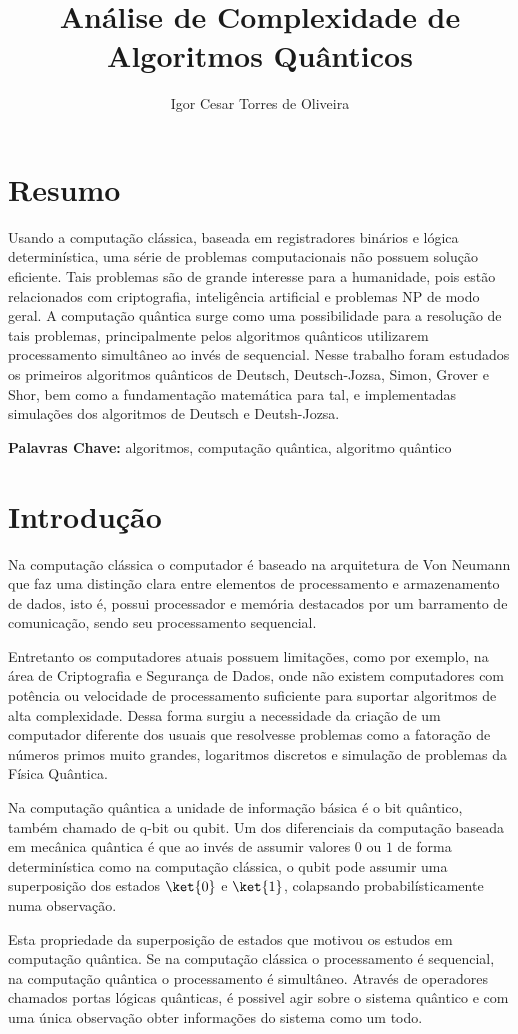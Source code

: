\documentclass[pfc]{imetex}
\author{Igor Cesar Torres de Oliveira}
\title{Análise de Complexidade de Algoritmos Quânticos}
\date{\the\year}
\begin{document}
 
\printFrontMatter

\chapter*{Resumo}
Usando a computação clássica, baseada em registradores binários e lógica determinística, uma série de problemas computacionais não possuem solução eficiente. Tais problemas são de grande interesse para a humanidade, pois estão relacionados com criptografia, inteligência artificial e problemas NP de modo geral. A computação quântica surge como uma possibilidade para a resolução de tais problemas, principalmente pelos algoritmos quânticos utilizarem processamento simultâneo ao invés de sequencial. Nesse trabalho foram estudados os primeiros algoritmos quânticos de Deutsch, Deutsch-Jozsa, Simon, Grover e Shor, bem como a fundamentação matemática para tal, e implementadas simulações dos algoritmos de Deutsch e Deutsh-Jozsa.

\textbf{Palavras Chave:} algoritmos, computação quântica, algoritmo quântico

\chapter{Introdução}
Na computação clássica o computador é baseado na arquitetura de Von Neumann que faz uma distinção clara entre elementos de processamento e armazenamento de dados, isto é, possui processador e memória destacados por um barramento de comunicação, sendo seu processamento sequencial.
 
Entretanto os computadores atuais possuem limitações, como por exemplo, na área de Criptografia e Segurança de Dados, onde não existem computadores com potência ou velocidade de processamento suficiente para suportar algoritmos de alta complexidade. Dessa forma surgiu a necessidade da criação de um computador diferente dos usuais que resolvesse problemas como a fatoração de números primos muito grandes, logaritmos discretos e simulação de problemas da Física Quântica.
  
Na computação quântica a unidade de informação básica é o bit quântico, também chamado de q-bit ou qubit. Um dos diferenciais da computação baseada em mecânica quântica é que ao invés de assumir valores $0$ ou $1$ de forma determinística como na computação clássica, o qubit pode assumir uma superposição dos estados $\ket{0}$ e $\ket{1}$, colapsando probabilísticamente numa observação.
 
Esta propriedade da superposição de estados que motivou os estudos em computação quântica. Se na computação clássica o processamento é sequencial, na computação quântica o processamento é simultâneo. Através de operadores chamados portas lógicas quânticas, é possivel agir sobre o sistema quântico e com uma única observação obter informações do sistema como um todo.
\end{document}
